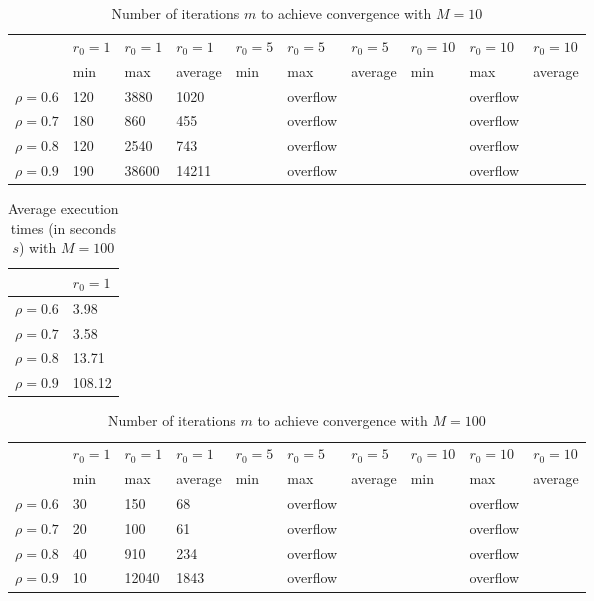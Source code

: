 \documentclass[a4paper,11pt,openright]{report}
\begin{document}
\begin{table}[H]
\centering
\addtolength{\leftskip}{-1.5cm}
\addtolength{\rightskip}{-1.5cm}
\begin{tabular}{|c|lllllllll|}
\hline
$ $ & $r_0 = 1$ & $r_0 = 1$ & $r_0 = 1$ & $r_0 = 5$ & $r_0 = 5$ & $r_0 = 5$ & $r_0 = 10$ & $r_0 = 10$ & $r_0 = 10$  \\
$ $ & min & max & average & min & max & average & min & max & average \\ 
\hline
$\rho = 0.6$ & 120 & 3880 & 1020 &  & overflow &  &  & overflow &  \\

$\rho = 0.7$ & 180 & 860 & 455 &  & overflow &  &  & overflow &  \\

$\rho = 0.8$ & 120 & 2540 & 743 &  & overflow &  &  & overflow & \\

$\rho = 0.9$ & 190 & 38600 & 14211 &  & overflow &  &  & overflow & \\
\hline
\end{tabular}
\caption{Number of iterations $m$ to achieve convergence with $M = 10$}
\end{table}
\begin{table}[H]
\centering
\addtolength{\leftskip}{-1.5cm}
\addtolength{\rightskip}{-1.5cm}
\begin{tabular}{|c|l|}
\hline
$ $ & $r_0 = 1$  \\
\hline
$\rho = 0.6$ & 3.98  \\

$\rho = 0.7$ & 3.58  \\

$\rho = 0.8$ & 13.71  \\

$\rho = 0.9$ & 108.12   \\
\hline
\end{tabular}
\caption{Average execution
 times (in seconds $s$) with $M = 100$}
\end{table}
\begin{table}[H]
\centering
\addtolength{\leftskip}{-1.5cm}
\addtolength{\rightskip}{-1.5cm}
\begin{tabular}{|c|lllllllll|}
\hline
$ $ & $r_0 = 1$ & $r_0 = 1$ & $r_0 = 1$ & $r_0 = 5$ & $r_0 = 5$ & $r_0 = 5$ & $r_0 = 10$ & $r_0 = 10$ & $r_0 = 10$  \\
$ $ & min & max & average & min & max & average & min & max & average \\ 
\hline
$\rho = 0.6$ & 30 & 150 & 68 &  & overflow &  &  & overflow &  \\

$\rho = 0.7$ & 20 & 100 & 61 &  & overflow &  &  & overflow &  \\

$\rho = 0.8$ & 40 & 910 & 234 &  & overflow &  &  & overflow & \\

$\rho = 0.9$ & 10 & 12040 & 1843 &  & overflow &  &  & overflow & \\
\hline
\end{tabular}
\caption{Number of iterations $m$ to achieve convergence with $M = 100$}
\end{table}
\end{document}
